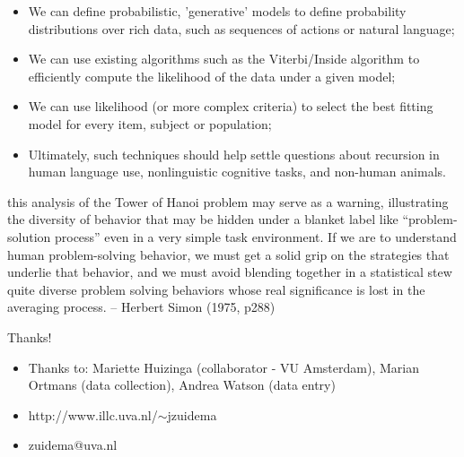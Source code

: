 \documentclass[xcolor=table]{beamer}
\begin{document}
\begin{frame}{}
  \begin{itemize}
  \item We can define probabilistic, 'generative' models to define
    probability distributions over rich data, such as sequences of
    actions or natural language;
  \item We can use existing algorithms such as the Viterbi/Inside
    algorithm to efficiently compute the likelihood of the data under
    a given model;
  \item We can use likelihood (or more complex criteria) to select the
    best fitting model for every item, subject or population;
  \item Ultimately, such techniques should help settle questions about
    recursion in human language use, nonlinguistic cognitive tasks,
    and non-human animals.

  \end{itemize}
\end{frame}


\begin{frame}
  this analysis of the Tower of Hanoi problem may serve as a warning,
  illustrating the diversity of behavior that may be hidden under a
  blanket label like ``problem-solution process'' even in a very
  simple task environment. If we are to understand human
  problem-solving behavior, we must get a solid grip on the strategies
  that underlie that behavior, and we must avoid blending together in
  a statistical stew quite diverse problem solving behaviors whose
  real significance is lost in the averaging process. -- Herbert Simon
  (1975, p288)
\end{frame}

\begin{frame}{Thanks!}
  \begin{itemize}
  \item 
 Thanks to: Mariette Huizinga (collaborator - VU Amsterdam), Marian Ortmans (data collection), Andrea Watson (data entry)
\item http://www.illc.uva.nl/$\sim$jzuidema
\item zuidema@uva.nl
  \end{itemize}
\end{frame}
\end{document}
